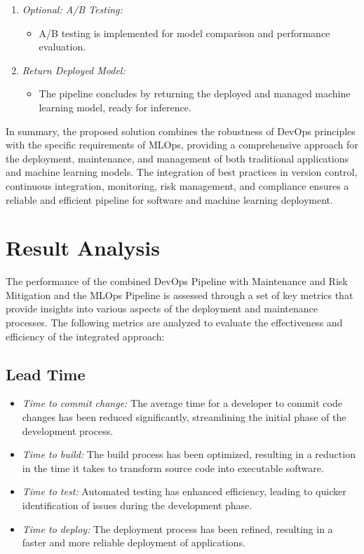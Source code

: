 \documentclass[12pt, letterpaper]{article}
\begin{document}
\begin{enumerate}
    \item \textit{Optional: A/B Testing:}
    \begin{itemize}
        \item A/B testing is implemented for model comparison and performance evaluation.
    \end{itemize}
    \vspace{1cm}
    \item \textit{Return Deployed Model:}
    \begin{itemize}
        \item The pipeline concludes by returning the deployed and managed machine learning model, ready for inference.
    \end{itemize}
\end{enumerate}

In summary, the proposed solution combines the robustness of DevOps principles with the specific requirements of MLOps, providing a comprehensive approach for the deployment, maintenance, and management of both traditional applications and machine learning models. The integration of best practices in version control, continuous integration, monitoring, risk management, and compliance ensures a reliable and efficient pipeline for software and machine learning deployment.




\section{Result Analysis}

The performance of the combined DevOps Pipeline with Maintenance and Risk Mitigation and the MLOps Pipeline is assessed through a set of key metrics that provide insights into various aspects of the deployment and maintenance processes. The following metrics are analyzed to evaluate the effectiveness and efficiency of the integrated approach:

\subsection*{Lead Time}

\begin{itemize}
    \item \textit{Time to commit change:} The average time for a developer to commit code changes has been reduced significantly, streamlining the initial phase of the development process.
  
    \item \textit{Time to build:} The build process has been optimized, resulting in a reduction in the time it takes to transform source code into executable software.
  
    \item \textit{Time to test:} Automated testing has enhanced efficiency, leading to quicker identification of issues during the development phase.
  
    \item \textit{Time to deploy:} The deployment process has been refined, resulting in a faster and more reliable deployment of applications.
\end{itemize}
\end{document}
